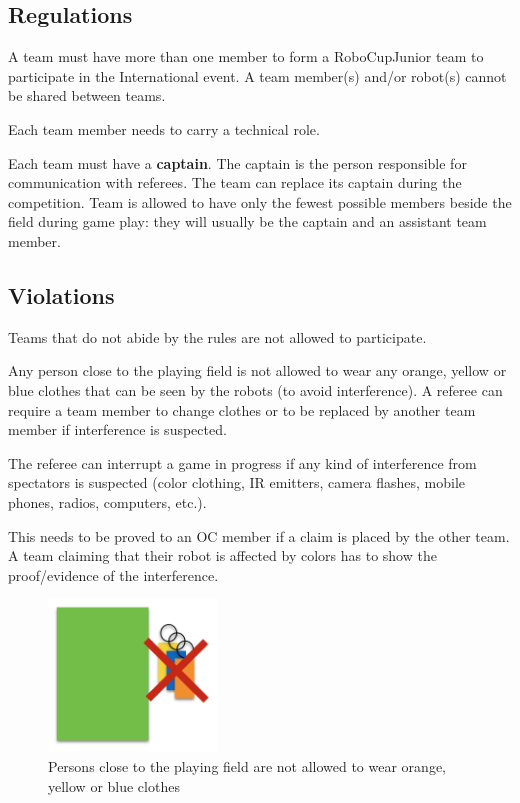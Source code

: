 \documentclass{article}
\begin{document}
\subsection{Regulations \label{ref-016}}

A team must have more than one member to form a RoboCupJunior team to
participate in the International event. A team member(s) and/or robot(s) cannot
be shared between teams.

Each team member needs to carry a technical role.

Each team must have a \textbf{captain}. The captain is the person responsible
for communication with referees. The team can replace its captain during the
competition. Team is allowed to have only the fewest possible members beside
the field during game play: they will usually be the captain and an assistant
team member.

\subsection{Violations \label{ref-017}}

Teams that do not abide by the rules are not allowed to participate.

Any person close to the playing field is not allowed to wear any orange, yellow
or blue clothes that can be seen by the robots (to avoid interference). A
referee can require a team member to change clothes or to be replaced by
another team member if interference is suspected.

The referee can interrupt a game in progress if any kind of interference from
spectators is suspected (color clothing, IR emitters, camera flashes, mobile
phones, radios, computers, etc.).

This needs to be proved to an OC member if a claim is placed by the other team.
A team claiming that their robot is affected by colors has to show the
proof/evidence of the interference.

\begin{figure}[H]
    \centering
    \includegraphics[width=0.4\textwidth]{media/image2.png}
    \caption{Persons close to the playing field are not allowed to wear orange,
        yellow or blue clothes}
    \label{fig:spectators}
\end{figure}
\end{document}
